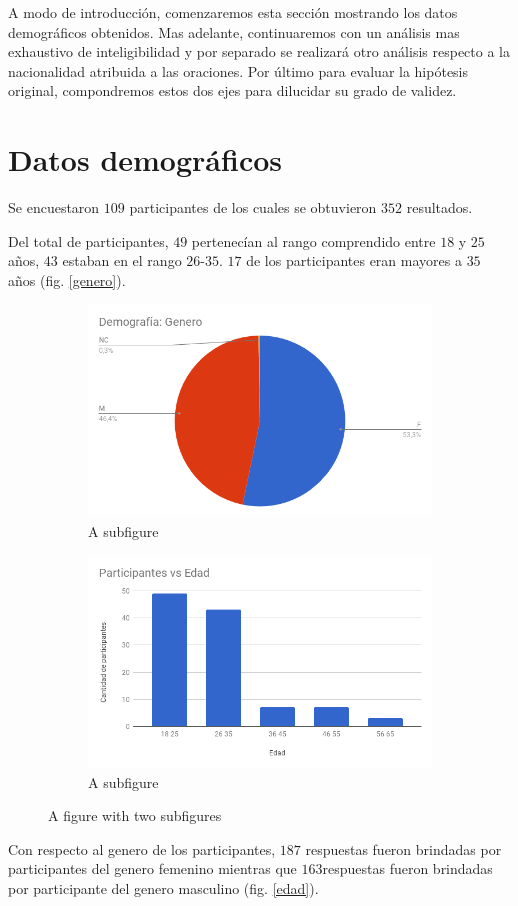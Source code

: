 
A modo de introducción, comenzaremos esta sección mostrando los datos demográficos obtenidos. Mas adelante, continuaremos con un análisis mas exhaustivo de inteligibilidad y por separado se realizará otro análisis respecto a la nacionalidad atribuida a las oraciones. Por último para evaluar la hipótesis original, compondremos estos dos ejes para dilucidar su grado de validez.

\section{Datos demográficos}

Se encuestaron $109$ participantes de los cuales se obtuvieron $352$ resultados.

Del total de participantes, $49$ pertenecían al rango comprendido entre $18$ y $25$ años, $43$ estaban en el rango $26$-$35$. $17$ de los participantes eran mayores a $35$ años (fig. \ref{genero}).

\begin{figure}
\centering
\begin{subfigure}{.5\textwidth}
  \centering
	\includegraphics[width=.4\linewidth]{datosDemograficos/genero.png}
  \caption{A subfigure}
  \label{fig:sub1}
\end{subfigure}%
\begin{subfigure}{.5\textwidth}
  \centering
	\includegraphics[width=.4\linewidth]{datosDemograficos/edad.png}
  \caption{A subfigure}
  \label{fig:sub2}
\end{subfigure}
\caption{A figure with two subfigures}
\label{fig:test}
\end{figure}

Con respecto al genero de los participantes, $187$ respuestas fueron brindadas por participantes del genero femenino mientras que $163$respuestas fueron brindadas por participante del genero masculino (fig. \ref{edad}).

